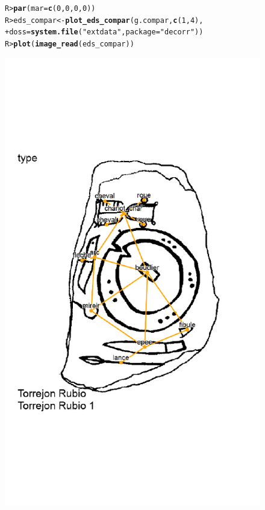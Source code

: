 \documentclass[article]{jss}\usepackage[]{graphicx}\usepackage[]{color}
\makeatletter
\def\maxwidth{ %
  \ifdim\Gin@nat@width>\linewidth
    \linewidth
  \else
    \Gin@nat@width
  \fi
}
\newcommand{\hlnum}[1]{\textcolor[rgb]{0.686,0.059,0.569}{#1}}%
\newcommand{\hlstr}[1]{\textcolor[rgb]{0.192,0.494,0.8}{#1}}%
\newcommand{\hlstd}[1]{\textcolor[rgb]{0.345,0.345,0.345}{#1}}%
\newcommand{\hlkwb}[1]{\textcolor[rgb]{0.69,0.353,0.396}{#1}}%
\newcommand{\hlkwc}[1]{\textcolor[rgb]{0.333,0.667,0.333}{#1}}%
\newcommand{\hlkwd}[1]{\textcolor[rgb]{0.737,0.353,0.396}{\textbf{#1}}}%
\newenvironment{kframe}{%
 \def\at@end@of@kframe{}%
 \ifinner\ifhmode%
  \def\at@end@of@kframe{\end{minipage}}%
  \begin{minipage}{\columnwidth}%
 \fi\fi%
 \def\FrameCommand##1{\hskip\@totalleftmargin \hskip-\fboxsep
 \colorbox{shadecolor}{##1}\hskip-\fboxsep
     \hskip-\linewidth \hskip-\@totalleftmargin \hskip\columnwidth}%
 \MakeFramed {\advance\hsize-\width
   \@totalleftmargin\z@ \linewidth\hsize
   \@setminipage}}%
 {\par\unskip\endMakeFramed%
 \at@end@of@kframe}
\newenvironment{knitrout}{}{} %
\makeatother
\begin{document}
\begin{figure}[H]
\begin{knitrout}
\color{fgcolor}\begin{kframe}
\begin{alltt}
\hlstd{R> }\hlkwd{par}\hlstd{(}\hlkwc{mar}\hlstd{=}\hlkwd{c}\hlstd{(}\hlnum{0}\hlstd{,}\hlnum{0}\hlstd{,}\hlnum{0}\hlstd{,}\hlnum{0}\hlstd{))}
\hlstd{R> }\hlstd{eds_compar} \hlkwb{<-} \hlkwd{plot_eds_compar}\hlstd{(g.compar,} \hlkwd{c}\hlstd{(}\hlnum{1}\hlstd{,}\hlnum{4}\hlstd{),}
\hlstd{+ }                              \hlkwc{doss} \hlstd{=} \hlkwd{system.file}\hlstd{(}\hlstr{"extdata"}\hlstd{,} \hlkwc{package} \hlstd{=} \hlstr{"decorr"}\hlstd{))}
\hlstd{R> }\hlkwd{plot}\hlstd{(}\hlkwd{image_read}\hlstd{(eds_compar))}
\end{alltt}
\end{kframe}
\includegraphics[width=\maxwidth]{figure/unnamed-chunk-11-1} 


\end{knitrout}
\end{figure}
\end{document}
